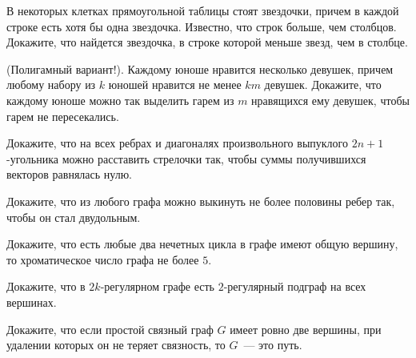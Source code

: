\setcounter{curtask}{1}


\begin{task}
    В некоторых клетках прямоугольной таблицы стоят звездочки, причем в каждой строке
    есть хотя бы одна звездочка. Известно, что строк больше, чем столбцов. Докажите,
    что найдется звездочка, в строке которой меньше звезд, чем в столбце.
\end{task}

\begin{task}
    (Полигамный вариант!).
    Каждому юноше нравится несколько девушек, причем любому набору из $k$ юношей
    нравится не менее $km$ девушек. Докажите, что каждому юноше можно так выделить
    гарем из $m$ нравящихся ему девушек, чтобы гарем не пересекались.
\end{task}

\begin{task}
    Докажите, что на всех ребрах и диагоналях произвольного выпуклого
    $2n + 1$-угольника можно расставить стрелочки так, чтобы суммы получившихся
    векторов равнялась нулю.
\end{task}

\begin{task}
    Докажите, что из любого графа можно выкинуть не более половины ребер так, чтобы
    он стал двудольным.
\end{task}

\begin{task}
    Докажите, что есть любые два нечетных цикла в графе имеют общую вершину, то
    хроматическое число графа не более $5$.
\end{task}

\begin{task}
    Докажите, что в $2k$-регулярном графе есть $2$-регулярный подграф на всех вершинах.
\end{task}

\begin{task}
    Докажите, что если простой связный граф $G$ имеет ровно две вершины, при удалении
    которых он не теряет связность, то $G$~--- это путь.
\end{task}
